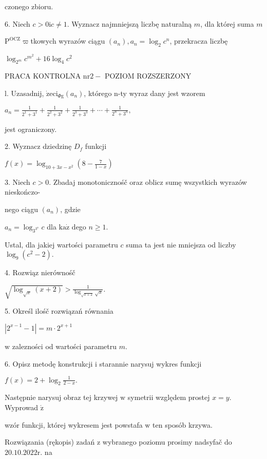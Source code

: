 \documentclass[a4paper,12pt]{article}
\begin{document}
czonego zbioru.

6. Niech $c > 0 \mathrm{i} c \neq 1$. Wyznacz najmniejszą liczbę naturalną $m$, dla której suma $m$

$\mathrm{P}^{\mathrm{O}\mathrm{C}\mathrm{Z}}\varpi$tkowych wyrazów ciągu $(a_{n}), a_{n}=\log_{2}c^{n}$, przekracza liczbę

$\log_{2^{m}}c^{m^{2}}+16\log_{4}c^{2}$




PRACA KONTROLNA $\mathrm{n}\mathrm{r} 2-$ POZIOM ROZSZERZONY

l. Uzasadnij, $\dot{\mathrm{z}}\mathrm{e}\mathrm{c}\mathrm{i}_{\Phi \mathrm{g}}(a_{n})$, którego n-ty wyraz dany jest wzorem

$a_{n}=\displaystyle \frac{1}{2^{1}+3^{1}}+\frac{1}{2^{2}+3^{2}}+\frac{1}{2^{3}+3^{3}}+\cdots+\frac{1}{2^{n}+3^{n}},$

jest ograniczony.

2. Wyznacz dziedzinę $D_{f}$ funkcji

$f(x)=\displaystyle \log_{10+3x-x^{2}}(8-\frac{7}{1-x})$

3. Niech $c>0$. Zbadaj monotonicznośč oraz oblicz sumę wszystkich wyrazów nieskończo-

nego ciągu $(a_{n})$, gdzie

$a_{n}=\log_{3^{3^{n}}}c$ dla $\mathrm{k}\mathrm{a}\dot{\mathrm{z}}$ dego $n\geq 1.$

Ustal, dla jakiej wartości parametru $c$ suma ta jest nie mniejsza od liczby $\log_{9}(c^{2}-2).$

4. Rozwiąz nierównośč

$\displaystyle \sqrt{\log_{\sqrt{x}}(x+2)}>\frac{1}{\log_{\sqrt{x+2}}\sqrt{x}}.$

5. Określ ilośč rozwiązań równania

$|2^{x-1}-1|=m\cdot 2^{x+1}$

$\mathrm{w}$ zalezności od wartości parametru $m.$

6. Opisz metodę konstrukcji $\mathrm{i}$ starannie narysuj wykres funkcji

$f(x)=2+\displaystyle \log_{2}\frac{1}{2-x}.$

Następnie narysuj obraz tej krzywej $\mathrm{w}$ symetrii względem prostej $x =y.$ Wyprowad $\acute{\mathrm{z}}$

wzór funkcji, której wykresem jest powstafa $\mathrm{w}$ ten sposób krzywa.

Rozwiązania (rękopis) zadań $\mathrm{z}$ wybranego poziomu prosimy nadsyfač do $20.10.2022\mathrm{r}$. na
\end{document}
